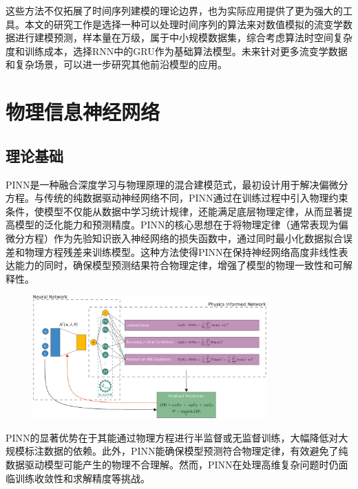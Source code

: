 这些方法不仅拓展了时间序列建模的理论边界，也为实际应用提供了更为强大的工具。本文的研究工作是选择一种可以处理时间序列的算法来对数值模拟的流变学数据进行建模预测，样本量在万级，属于中小规模数据集，综合考虑算法时空间复杂度和训练成本，选择RNN中的GRU作为基础算法模型。未来针对更多流变学数据和复杂场景，可以进一步研究其他前沿模型的应用。
\section{物理信息神经网络}
\subsection{理论基础}
PINN是一种融合深度学习与物理原理的混合建模范式，最初设计用于解决偏微分方程\cite{raissiPhysicsinformedNeuralNetworks2019a}。与传统的纯数据驱动神经网络不同，PINN通过在训练过程中引入物理约束条件，使模型不仅能从数据中学习统计规律，还能满足底层物理定律，从而显著提高模型的泛化能力和预测精度。PINN的核心思想在于将物理定律（通常表现为偏微分方程）作为先验知识嵌入神经网络的损失函数中，通过同时最小化数据拟合误差和物理方程残差来训练模型。这种方法使得PINN在保持神经网络高度非线性表达能力的同时，确保模型预测结果符合物理定律，增强了模型的物理一致性和可解释性。
\begin{figure}[htbp]
  \centering
  \includegraphics[width=0.8\textwidth]{Fig/pinn_logo.png}
\end{figure}
PINN的显著优势在于其能通过物理方程进行半监督或无监督训练，大幅降低对大规模标注数据的依赖。此外，PINN能确保模型预测符合物理定律，有效避免了纯数据驱动模型可能产生的物理不合理解。然而，PINN在处理高维复杂问题时仍面临训练收敛性和求解精度等挑战。
